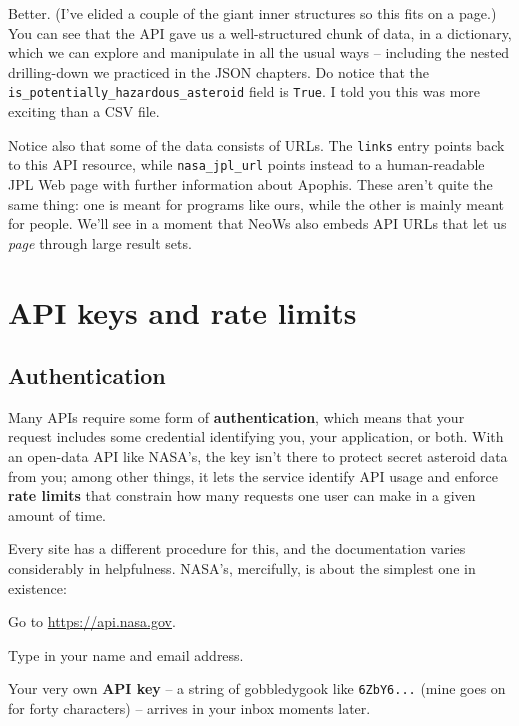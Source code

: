 
Better. (I've elided a couple of the giant inner structures so this fits on a
page.) You can see that the API gave us a well-structured chunk of data, in a
dictionary, which we can explore and manipulate in all the usual ways --
including the nested drilling-down we practiced in the JSON chapters. 
Do notice that the \\
\texttt{is\_potentially\_hazardous\_asteroid} field is \texttt{True}.
I told you this was more exciting than a CSV file.


Notice also that some of the data consists of URLs. The \texttt{links} entry
points back to this API resource, while \texttt{nasa\_jpl\_url} points instead
to a human-readable JPL Web page with further information about Apophis. These
aren't quite the same thing: one is meant for programs like ours, while the
other is mainly meant for people. We'll see in a moment that NeoWs also embeds
API URLs that let us \textit{page} through large result sets.

\section{API keys and rate limits}

\subsection{Authentication}


Many APIs require some form of \textbf{authentication}, which means that your
request includes some credential identifying you, your application, or both.
With an open-data API like NASA's, the key isn't there to protect secret
asteroid data from you; among other things, it lets the service identify API
usage and enforce \textbf{rate limits} that constrain how many requests one
user can make in a given amount of time.

Every site has a different procedure for this, and the documentation varies
considerably in helpfulness. NASA's, mercifully, is about the simplest one in
existence:

\begin{compactenum}
\item Go to \url{https://api.nasa.gov}.
\item Type in your name and email address.
\item Your very own \textbf{API key} -- a string of gobbledygook like
\texttt{6ZbY6...} (mine goes on for forty characters) -- arrives in your inbox
moments later.
\end{compactenum}

